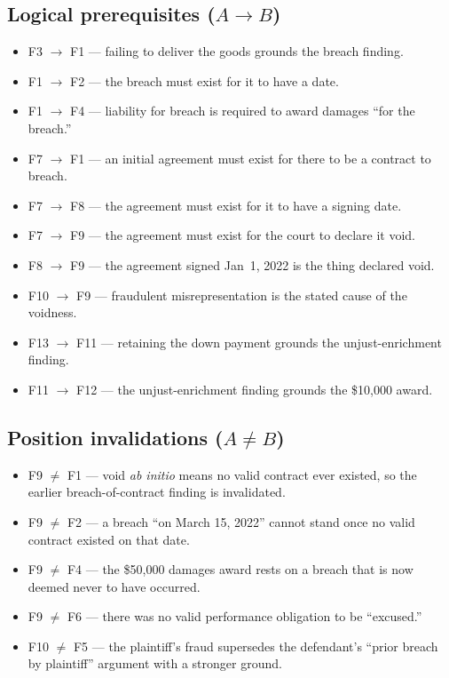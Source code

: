 \documentclass[11pt]{article}
\begin{document}
\subsection*{Logical prerequisites ($A \rightarrow B$)}
\begin{itemize}[leftmargin=*]
  \item F3 $\rightarrow$ F1 --- failing to deliver the goods grounds the breach finding.
  \item F1 $\rightarrow$ F2 --- the breach must exist for it to have a date.
  \item F1 $\rightarrow$ F4 --- liability for breach is required to award damages ``for the breach.''
  \item F7 $\rightarrow$ F1 --- an initial agreement must exist for there to be a contract to breach.
  \item F7 $\rightarrow$ F8 --- the agreement must exist for it to have a signing date.
  \item F7 $\rightarrow$ F9 --- the agreement must exist for the court to declare it void.
  \item F8 $\rightarrow$ F9 --- the agreement signed Jan~1, 2022 is the thing declared void.
  \item F10 $\rightarrow$ F9 --- fraudulent misrepresentation is the stated cause of the voidness.
  \item F13 $\rightarrow$ F11 --- retaining the down payment grounds the unjust-enrichment finding.
  \item F11 $\rightarrow$ F12 --- the unjust-enrichment finding grounds the \$10,000 award.
\end{itemize}

\subsection*{Position invalidations ($A \neq B$)}
\begin{itemize}[leftmargin=*]
  \item F9 $\neq$ F1 --- void \emph{ab initio} means no valid contract ever existed,
        so the earlier breach-of-contract finding is invalidated.
  \item F9 $\neq$ F2 --- a breach ``on March 15, 2022'' cannot stand once no valid
        contract existed on that date.
  \item F9 $\neq$ F4 --- the \$50,000 damages award rests on a breach that is now
        deemed never to have occurred.
  \item F9 $\neq$ F6 --- there was no valid performance obligation to be ``excused.''
  \item F10 $\neq$ F5 --- the plaintiff's fraud supersedes the defendant's
        ``prior breach by plaintiff'' argument with a stronger ground.
\end{itemize}
\end{document}
